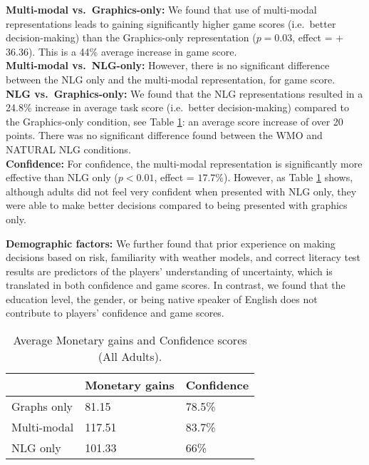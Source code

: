\documentclass[11pt]{article}
\begin{document}
{\bf Multi-modal vs.\ Graphics-only:}
We found that use of  multi-modal representations  leads to gaining significantly higher game scores (i.e.\ better decision-making) than the Graphics-only representation ($p = 0.03$, effect = +$36.36$). %
 This is a 44\% average increase in game score.\\
{\bf Multi-modal vs.\ NLG-only:}
However, there is no significant difference between the NLG only and the multi-modal representation, for game score.\\
{\bf NLG vs.\ Graphics-only:}
We found that the NLG representations resulted in a 24.8\% increase in average task score (i.e.\ better decision-making) compared to the Graphics-only condition, see Table \ref{tab:results}: an average   score increase of over 20 points.
 There was no significant difference found between the WMO and NATURAL NLG conditions.\\
\noindent
{\bf Confidence:} For confidence, the multi-modal representation is significantly more effective than NLG only ($p<0.01$, effect = $17.7\%$). However, as Table \ref{tab:results} shows, although adults did not feel very confident when presented with NLG only, they were able to make better decisions compared to being presented with graphics only.

\noindent
{\bf Demographic factors:}
We further found that prior experience on making decisions based on risk, familiarity with weather models, and correct literacy test results are predictors of the players' understanding of uncertainty, which is translated in both confidence and game scores. In contrast, we found that the education level, the gender, or being native speaker of English does not contribute to players' confidence and game scores.

\begin{table}
\small
\centering
\begin{tabular}{|p{2.5cm}|l|p{2cm}|}
\hline   & \bf Monetary gains & \bf Confidence  \\ \hline \hline
Graphs only & 81.15 & 78.5\% \\
Multi-modal & 117.51& 83.7\%\\
NLG only &101.33 & 66\%\\
\hline
\end{tabular}
\caption{\label{tab:results} Average Monetary gains and Confidence scores (All Adults).}
\end{table}
\end{document}
